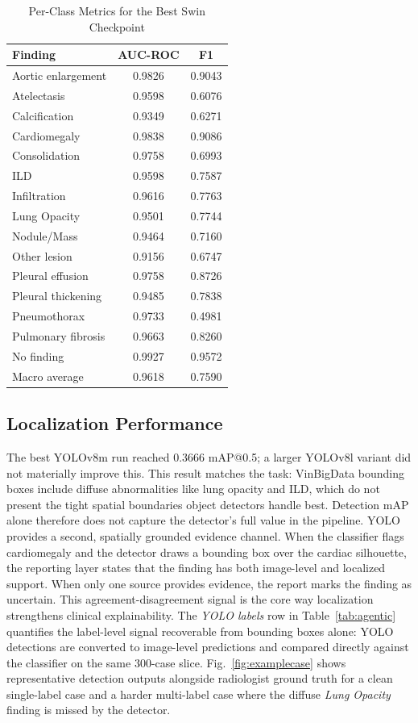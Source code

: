 \documentclass[conference]{IEEEtran}
\begin{document}
\begin{table}[t]
\caption{Per-Class Metrics for the Best Swin Checkpoint}
\label{tab:swin_per_class}
\centering
\footnotesize
\begin{tabular}{lcc}
\toprule
Finding & AUC-ROC & F1 \\
\midrule
Aortic enlargement & 0.9826 & 0.9043 \\
Atelectasis & 0.9598 & 0.6076 \\
Calcification & 0.9349 & 0.6271 \\
Cardiomegaly & 0.9838 & 0.9086 \\
Consolidation & 0.9758 & 0.6993 \\
ILD & 0.9598 & 0.7587 \\
Infiltration & 0.9616 & 0.7763 \\
Lung Opacity & 0.9501 & 0.7744 \\
Nodule/Mass & 0.9464 & 0.7160 \\
Other lesion & 0.9156 & 0.6747 \\
Pleural effusion & 0.9758 & 0.8726 \\
Pleural thickening & 0.9485 & 0.7838 \\
Pneumothorax & 0.9733 & 0.4981 \\
Pulmonary fibrosis & 0.9663 & 0.8260 \\
No finding & 0.9927 & 0.9572 \\
\midrule
Macro average & 0.9618 & 0.7590 \\
\bottomrule
\end{tabular}
\end{table}

\subsection{Localization Performance}
The best YOLOv8m run reached 0.3666 mAP@0.5; a larger YOLOv8l variant did not materially improve this. This result matches the task: VinBigData bounding boxes include diffuse abnormalities like lung opacity and ILD, which do not present the tight spatial boundaries object detectors handle best. Detection mAP alone therefore does not capture the detector's full value in the pipeline. YOLO provides a second, spatially grounded evidence channel. When the classifier flags cardiomegaly and the detector draws a bounding box over the cardiac silhouette, the reporting layer states that the finding has both image-level and localized support. When only one source provides evidence, the report marks the finding as uncertain. This agreement-disagreement signal is the core way localization strengthens clinical explainability. The \textit{YOLO labels} row in Table~\ref{tab:agentic} quantifies the label-level signal recoverable from bounding boxes alone: YOLO detections are converted to image-level predictions and compared directly against the classifier on the same 300-case slice. Fig.~\ref{fig:examplecase} shows representative detection outputs alongside radiologist ground truth for a clean single-label case and a harder multi-label case where the diffuse \textit{Lung Opacity} finding is missed by the detector.
\end{document}
